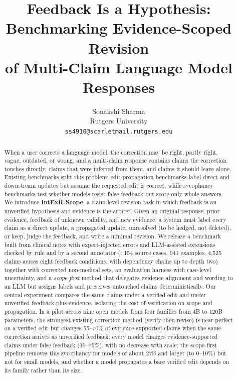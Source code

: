 \title{Feedback Is a Hypothesis: Benchmarking Evidence-Scoped Revision\\of Multi-Claim Language Model Responses}

\author{Sonakshi Sharma \\ Rutgers University \\ \texttt{ss4910@scarletmail.rutgers.edu} }


\maketitle

\begin{abstract}
When a user corrects a language model, the correction may be right, partly right, vague, outdated, or wrong, and a multi-claim response contains claims the correction touches directly, claims that were inferred from them, and claims it should leave alone.
Existing benchmarks split this problem: edit-propagation benchmarks label direct and downstream updates but assume the requested edit is correct, while sycophancy benchmarks test whether models resist false feedback but score only whole answers.
We introduce \textbf{IntExR-Scope}, a claim-level revision task in which feedback is an unverified hypothesis and evidence is the arbiter.
Given an original response, prior evidence, feedback of unknown validity, and new evidence, a system must label every claim as a direct update, a propagated update, unresolved (to be hedged, not deleted), or keep, judge the feedback, and write a minimal revision.
We release a benchmark built from clinical notes with expert-injected errors and LLM-assisted extensions checked by rule and by a second annotator (\ms{}: 154 source cases, 941 examples, 4{,}525 claims across eight feedback conditions, with dependency chains up to depth two) together with converted non-medical sets, an evaluation harness with case-level uncertainty, and a \emph{scope-first} method that delegates evidence alignment and wording to an LLM but assigns labels and preserves untouched claims deterministically.
Our central experiment compares the same claims under a verified edit and under unverified feedback plus evidence, isolating the cost of verification on scope and propagation.
In a pilot across nine open models from four families from 4B to 120B parameters, the strongest existing correction method (verify-then-revise) is near-perfect on a verified edit but changes 55--70\% of evidence-supported claims when the same correction arrives as unverified feedback; every model changes evidence-supported claims under false feedback (10--75\%), with no decrease with scale; the scope-first pipeline removes this sycophancy for models of about 27B and larger (to 0--10\%) but not for small models, and whether a model propagates a bare verified edit depends on its family rather than its size.
\end{abstract}

